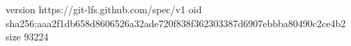 version https://git-lfs.github.com/spec/v1
oid sha256:aaa2f1db658d8606526a32ade720f838f362303387d6907ebbba80490c2ce4b2
size 93224
